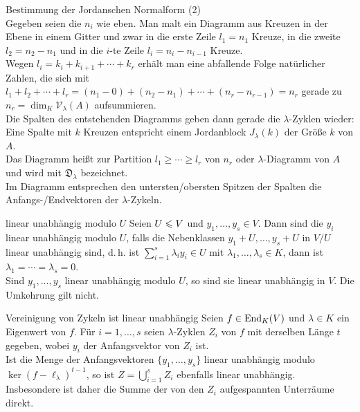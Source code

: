 \begin{Prozedur}{Bestimmung der Jordanschen Normalform (2)} \\
    Gegeben seien die $n_i$ wie eben.
    Man malt ein Diagramm aus Kreuzen in der Ebene in einem Gitter
    und zwar in die erste Zeile $l_1 = n_1$ Kreuze, in die zweite
    $l_2 = n_2 - n_1$ und in die $i$-te Zeile
    $l_i = n_i - n_{i-1}$ Kreuze. \\
    Wegen $l_i = k_i + k_{i+1} + \dotsb + k_r$ erhält man eine abfallende
    Folge natürlicher Zahlen, die sich mit $l_1 + l_2 + \dotsb + l_r =
    (n_1 - 0) + (n_2 - n_1) + \dotsb + (n_r - n_{r-1}) = n_r$ gerade zu
    $n_r = \dim_K \mathcal{V}_\lambda(A)$ aufsummieren. \\
    Die Spalten des entstehenden Diagramms geben dann gerade
    die $\lambda$-Zyklen wieder:
    Eine Spalte mit $k$ Kreuzen entspricht einem Jordanblock $J_\lambda(k)$
    der Größe $k$ von $A$. \\
    Das Diagramm heißt 
    zur Partition $l_1 \ge \dotsb \ge l_r$ von $n_r$ oder
    $\lambda$-Diagramm von $A$ und wird mit $\mathfrak{D}_\lambda$
    bezeichnet. \\
    Im Diagramm entsprechen den untersten/obersten Spitzen der Spalten
    die Anfangs-/Endvektoren der $\lambda$-Zykeln.
\end{Prozedur}

\begin{Def}{linear unabhängig modulo $U$}
    Seien $U \leqslant V$ und $y_1, \dotsc, y_s \in V$.
    Dann sind die $y_i$ linear unabhängig modulo $U$, falls die
    Nebenklassen $y_1 + U, \dotsc, y_s + U$ in $V/U$ linear unabhängig sind,
    d.\,h. ist $\sum_{i=1}^s \lambda_i y_i \in U$ mit
    $\lambda_1, \dotsc, \lambda_s \in K$, dann ist
    $\lambda_1 = \dotsb = \lambda_s = 0$. \\
    Sind $y_1, \dotsc, y_s$ linear unabhängig modulo $U$, so sind sie
    linear unabhängig in $V$.
    Die Umkehrung gilt nicht.
\end{Def}

\begin{Satz}{Vereinigung von Zykeln ist linear unabhängig}
    Seien $f \in \operatorname{End}_K(V)$ und $\lambda \in K$ ein Eigenwert von $f$.
    Für $i = 1, \dotsc, s$ seien $\lambda$-Zyklen $Z_i$ von $f$ mit derselben
    Länge $t$ gegeben, wobei $y_i$ der Anfangsvektor von $Z_i$ ist. \\
    Ist die Menge der Anfangsvektoren $\{y_1, \dotsc, y_s\}$ linear
    unabhängig modulo $\ker(f - \ell_\lambda)^{t-1}$, so ist
    $Z = \bigcup_{i=1}^s Z_i$ ebenfalls linear unabhängig. \\
    Insbesondere ist daher die Summe der von den $Z_i$ aufgespannten
    Unterräume direkt.
\end{Satz}

